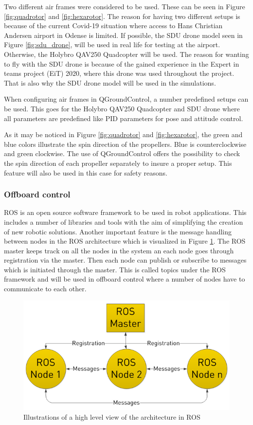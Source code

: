 \documentclass[../Head/report.tex]{subfiles}
\begin{document}
Two different air frames were considered to be used. These can be seen in Figure \ref{fig:quadrotor} and \ref{fig:hexarotor}. The reason for having two different setups is because of the current Covid-19 situation where access to Hans Christian Andersen airport in Odense is limited. If possible, the SDU drone model seen in Figure \ref{fig:sdu_drone}, will be used in real life for testing at the airport. Otherwise, the Holybro QAV250 Quadcopter will be used. The reason for wanting to fly with the SDU drone is because of the gained experience in the Expert in teams project (EiT) 2020, where this drone was used throughout the project. That is also why the SDU drone model will be used in the simulations. 

When configuring air frames in QGroundControl, a number predefined setups can be used. This goes for the Holybro QAV250 Quadcopter and SDU drone where all parameters are predefined like PID parameters for pose and attitude control.

As it may be noticed in Figure \ref{fig:quadrotor} and \ref{fig:hexarotor}, the green and blue colors illustrate the spin direction of the propellers. Blue is counterclockwise and green clockwise. The use of QGroundControl offers the possibility to check the spin direction of each propeller separately to insure a proper setup. This feature will also be used in this case for safety reasons.  

 
\subsubsection{Offboard control}
\label{sec:offboard_control}

ROS is an open source software framework to be used in robot applications. This includes a number of libraries and tools with the aim of simplifying the creation of new robotic solutions. Another important feature is the message handling between nodes in the ROS architecture which is visualized in Figure \ref{fig:ros}. The ROS master keeps track on all the nodes in the system an each node goes through registration via the master. Then each node can publish or subscribe to messages which is initiated through the master. This is called topics under the ROS framework and will be used in offboard control where a number of nodes have to communicate to each other.  

\begin{figure}[H]
    \centering
    \includegraphics[width=0.6\linewidth]{../Figures/ros.png}
    \caption{Illustrations of a high level view of the architecture in ROS}
    \label{fig:ros}
\end{figure}
\end{document}
